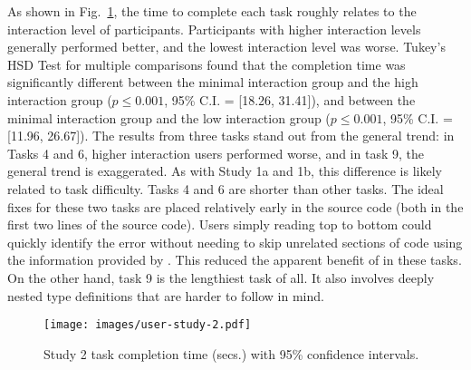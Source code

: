 As shown in  Fig.~\ref{fig:r4-analysis}, the time to complete each task roughly relates to the interaction level of participants. Participants with higher interaction levels generally performed better, and the lowest interaction level was worse. Tukey’s HSD Test for multiple comparisons found that the completion time was significantly different between the minimal interaction group and the high interaction group ($p \le 0.001$, 95\% C.I. = [18.26, 31.41]), and between the minimal interaction group and the low interaction group ($p \le 0.001$, 95\% C.I. = [11.96, 26.67]). The results from three tasks stand out from the general trend: in Tasks 4 and 6, higher interaction users performed worse, and in task 9, the general trend is exaggerated. As with Study 1a and 1b, this difference is likely related to task difficulty. Tasks 4 and 6 are shorter than other tasks. The ideal fixes for these two tasks are placed relatively early in the source code (both in the first two lines of the source code). Users simply reading top to bottom could quickly identify the error without needing to skip unrelated sections of code using the information provided by \chameleon{}. This reduced the apparent benefit of \chameleon{} in these tasks. On the other hand, task 9 is the lengthiest task of all. It also involves deeply nested type definitions that are harder to follow in mind.

\begin{figure}[ht]
    \centering
    \texttt{[image: images/user-study-2.pdf]}
    \caption{Study 2 task completion time (secs.) with 95\% confidence intervals.}
    \label{fig:r4-analysis}
\end{figure}




